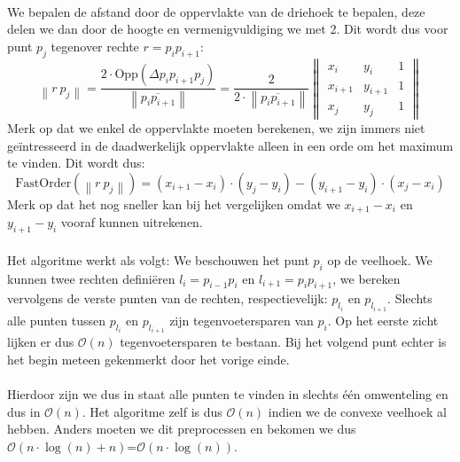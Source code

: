 \documentclass[a4paper,titlepage]{article}
\newcommand{\norm}[1]{\left\|#1\right\|}
\newcommand{\linep}[1]{\overline{#1}}
\newcommand{\brak}[1]{\left(#1\right)}
\newcommand{\bigoh}[1]{\ensuremath{\mathcal{O}\left(#1\right)}}
\begin{document}
\paragraph{}We bepalen de afstand door de oppervlakte van de driehoek te bepalen, deze delen we dan door de hoogte en vermenigvuldiging we met 2. Dit wordt dus voor punt $p_j$ tegenover rechte $r=p_ip_{i+1}$:
\begin{equation}
\norm{r\ p_j}=\displaystyle\frac{2\cdot\mbox{Opp}\brak{\Delta p_ip_{i+1}p_j}}{\norm{\linep{p_ip_{i+1}}}}=\displaystyle\frac{2}{2\cdot\norm{\linep{p_ip_{i+1}}}}\norm{
\begin{array}{ccc}
x_i&y_i&1\\
x_{i+1}&y_{i+1}&1\\
x_j&y_j&1
\end{array}}
\end{equation}
Merk op dat we enkel de oppervlakte moeten berekenen, we zijn immers niet ge\"intresseerd in de daadwerkelijk oppervlakte alleen in een orde om het maximum te vinden. Dit wordt dus:
\begin{equation}
\mbox{FastOrder}\brak{\norm{r\ p_j}}=\brak{x_{i+1}-x_i}\cdot\brak{y_j-y_i}-\brak{y_{i+1}-y_i}\cdot\brak{x_j-x_i}
\end{equation}
Merk op dat het nog sneller kan bij het vergelijken omdat we $x_{i+1}-x_i$ en $y_{i+1}-y_i$ vooraf kunnen uitrekenen.
\paragraph{}Het algoritme werkt als volgt: We beschouwen het punt $p_i$ op de veelhoek. We kunnen twee rechten defini\"eren $l_i=p_{i-1}p_i$ en $l_{i+1}=p_ip_{i+1}$, we bereken vervolgens de verste punten van de rechten, respectievelijk: $p_{l_i}$ en $p_{l_{i+1}}$. Slechts alle punten tussen $p_{l_i}$ en $p_{l_{i+1}}$ zijn tegenvoetersparen van $p_i$. Op het eerste zicht lijken er dus \bigoh{n} tegenvoetersparen te bestaan. Bij het volgend punt echter is het begin meteen gekenmerkt door het vorige einde.
\paragraph{}Hierdoor zijn we dus in staat alle punten te vinden in slechts \'e\'en omwenteling en dus in \bigoh{n}. Het algoritme zelf is dus \bigoh{n} indien we de convexe veelhoek al hebben. Anders moeten we dit preprocessen en bekomen we dus \bigoh{n\cdot\log\brak{n}+n}=\bigoh{n\cdot\log\brak{n}}.
\end{document}
